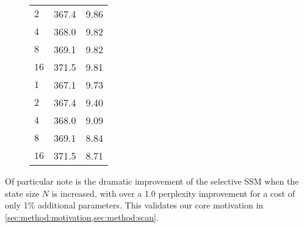 \begin{figure}[!t]
\begin{minipage}{.65\linewidth}
\begin{tabular}{@{}lll@{}}
      $2$                 & 367.4 & 9.86 \\ %
      $4$                 & 368.0 & 9.82 \\ %
      $8$                 & 369.1 & 9.82 \\ %
      $16$                & 371.5 & 9.81 \\ %
      \midrule
      $1$                 & 367.1 & 9.73 \\ %
      $2$                 & 367.4 & 9.40 \\ %
      $4$                 & 368.0 & 9.09 \\ %
      $8$                 & 369.1 & 8.84 \\ %
      $16$                & 371.5 & 8.71 \\ %
      \bottomrule
    \end{tabular}
    \label{tab:ablations-N}
  \end{minipage}
\end{figure}

Of particular note is the dramatic improvement of the selective SSM when the state size $N$ is increased, with over a 1.0 perplexity improvement for a cost of only 1\% additional parameters.
This validates our core motivation in \cref{sec:method:motivation,sec:method:scan}.
